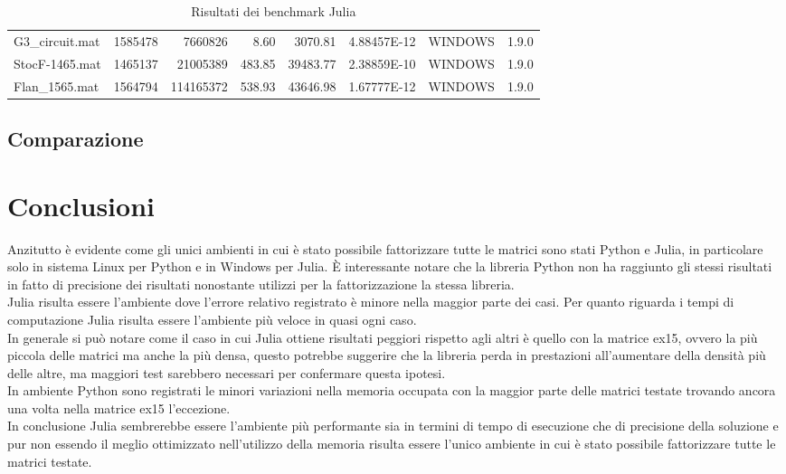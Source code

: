 \documentclass{report}
\begin{document}
\begin{table}[h]
{\begin{tabular}{@{}lrrrrrcc@{}}
                    G3\_circuit.mat     & 1585478 & 7660826   & 8.60   & 3070.81  & 4.88457E-12 & WINDOWS & 1.9.0 \\
                    StocF-1465.mat      & 1465137 & 21005389  & 483.85 & 39483.77 & 2.38859E-10 & WINDOWS & 1.9.0 \\
                    Flan\_1565.mat      & 1564794 & 114165372 & 538.93 & 43646.98 & 1.67777E-12 & WINDOWS & 1.9.0 \\ \bottomrule
                    \end{tabular}%
                    }
                    \caption{Risultati dei benchmark Julia}
                    \label{tab:result_julia}
                \end{table}
            
        \section{Comparazione}

    \chapter{Conclusioni}
        Anzitutto è evidente come gli unici ambienti in cui è stato possibile fattorizzare tutte le matrici sono 
        stati Python e Julia, in particolare solo in sistema Linux per Python e in Windows per Julia. 
        \`E interessante notare che la libreria Python non ha raggiunto gli stessi risultati in fatto di precisione
        dei risultati nonostante utilizzi per la fattorizzazione la stessa libreria.\\
        Julia risulta essere l'ambiente dove l'errore relativo registrato è minore nella maggior parte 
        dei casi. 
        Per quanto riguarda i tempi di computazione Julia risulta essere l'ambiente più veloce in quasi ogni caso.\\
        In generale si può notare come il caso in cui Julia ottiene risultati peggiori rispetto agli altri è quello 
        con la matrice ex15, ovvero la più piccola delle matrici ma anche la più densa, questo potrebbe suggerire 
        che la libreria perda in prestazioni all'aumentare della densità più delle altre, ma maggiori test sarebbero
        necessari per confermare questa ipotesi.\\
        In ambiente Python sono registrati le minori variazioni nella memoria occupata con la maggior parte delle
        matrici testate trovando ancora una volta nella matrice ex15 l'eccezione.\\
        In conclusione Julia sembrerebbe essere l'ambiente più performante sia in termini di tempo di esecuzione che
        di precisione della soluzione e pur non essendo il meglio ottimizzato nell'utilizzo della memoria risulta
        essere l'unico ambiente in cui è stato possibile fattorizzare tutte le matrici testate.

            
                
\end{document}
